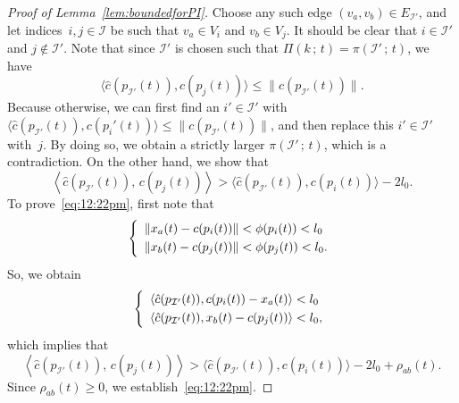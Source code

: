 \documentclass[10pt,twocolumn,twoside]{IEEEtran}
\renewcommand{\cal}{\mathcal}
\renewcommand{\(}{\left (}
\renewcommand{\)}{\right )}
\renewcommand{\;}{\,;\,}
\begin{document}
\begin{proof}[Proof of Lemma~\ref{lem:boundedforPI}]
Choose any such edge $(v_a,v_b) \in E_{\cal{I}'}$, and let indices~$i, j\in \cal{I}$ be such that $v_a\in V_{i}$ and $v_{b} \in V_{j}$. 
It should be clear that  $i\in \cal{I}'$ and $j\notin \cal{I}'$. Note that since $\cal{I}'$ is chosen such that $\Pi(k\; t) = \pi(\cal{I}'\; t)$, we have 
$$\langle \hat c(p_{\cal{I}'}(t)), c(p_j(t)) \rangle \le \| c(p_{\cal{I}'}(t))\|.$$ Because otherwise, we can first find an $i'\in \cal{I}'$ with $\langle \hat c(p_{\cal{I}'}(t)), c(p_i'(t))\rangle \le \|c(p_{\cal{I}'}(t))\|$, and then replace this $i'\in \cal{I}'$ with~$j$. By doing so, we obtain a strictly larger $\pi(\cal{I}'\;t)$, which is a contradiction. On the other hand,     
we show that 
\begin{equation}\label{eq:12:22pm}
 \left\langle  \hat c(p_{\cal{I}'}(t)),\, c(p_{j}(t)) \right\rangle > \langle \hat c(p_{\cal{I}'}(t)), c(p_{i}(t)) \rangle - 2l_0. \end{equation}
To prove~\eqref{eq:12:22pm}, first note that 
$$
\left\{
\begin{array}{l}
\| x_{a}(t) - c(p_{i}(t))\| < \phi(p_{i}(t)) < l_0 \vspace{3pt}\\
\| x_{b}(t) - c(p_{j}(t))\| < \phi(p_{j}(t))  < l_0.
\end{array}
\right.
$$
So, we obtain
\begin{equation*}\label{eq:1:59pm}
\left\{
\begin{array}{l}
\langle  \hat c(p_{\cal{I}'}(t)),    c(p_{i}(t)) - x_{a}(t)  \rangle < l_0  \vspace{3pt}\\
\langle  \hat c(p_{\cal{I}'}(t)),   x_{b}(t) - c(p_{j}(t)) \rangle < l_0,
\end{array}
\right. 
\end{equation*}
which implies that 
$$
\left\langle  \hat c(p_{\cal{I}'}(t)),\, c(p_{j}(t)) \right\rangle > \langle \hat  c(p_{\cal{I}'}(t)), c(p_{i}(t)) \rangle - 2l_0 + \rho_{ab}(t).
$$
Since $\rho_{ab}(t) \ge 0$, we establish~\eqref{eq:12:22pm}. 



\end{proof}
\end{document}
